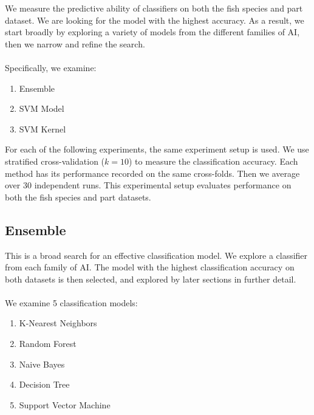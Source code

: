 \documentclass{article}
\begin{document}
We measure the predictive ability of classifiers on both the fish species and part dataset.
We are looking for the model with the highest accuracy.
As a result, we start broadly by exploring a variety of models from the different families of AI, then we narrow and refine the search.
\\\\
Specifically, we examine:

\begin{enumerate}
  \item Ensemble
  \item SVM Model
  \item SVM Kernel
\end{enumerate}

For each of the following experiments, the same experiment setup is used.
We use stratified cross-validation ($k=10$) to measure the classification accuracy.
Each method has its performance recorded on the same cross-folds.
Then we average over 30 independent runs.
This experimental setup evaluates performance on both the fish species and part datasets.

\subsection{Ensemble}

This is a broad search for an effective classification model.
We explore a classifier from each family of AI.
The model with the highest classification accuracy on both datasets is then selected, and explored by later sections in further detail.
\\\\
We examine 5 classification models:

\begin{enumerate}
  \item K-Nearest Neighbors \cite{fix1989discriminatory}
  \item Random Forest \cite{ho1995random}
  \item Naive Bayes \cite{hand2001idiot}
  \item Decision Tree \cite{loh2011classification}
  \item Support Vector Machine \cite{cortes1995support}
\end{enumerate}
\end{document}

